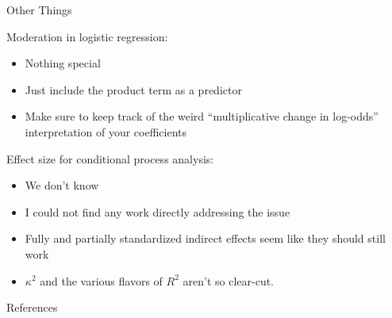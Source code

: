 \documentclass{beamer}
\newcommand{\va}[0]{\vspace{12pt}}
\newcommand{\vb}[0]{\vspace{6pt}}
\newcommand{\vc}[0]{\vspace{3pt}}
\begin{document}
\begin{frame}{Other Things}
  
  Moderation in logistic regression:
  \vb
  \begin{itemize}
    \item Nothing special
      \vc
    \item Just include the product term as a predictor
      \vc
    \item Make sure to keep track of the weird ``multiplicative change
      in log-odds'' interpretation of your coefficients
  \end{itemize}
  \va
  \pause
  Effect size for conditional process analysis:
  \vb
  \begin{itemize}
    \item We don't know
      \vc
    \item I could not find any work directly addressing the issue
      \vc
    \item Fully and partially standardized indirect effects seem like
      they should still work
      \vc
    \item $\kappa^2$ and the various flavors of $R^2$ aren't so
      clear-cut.
  \end{itemize}
  
\end{frame}



\begin{frame}{References}

  
  

\end{frame}
\end{document}
